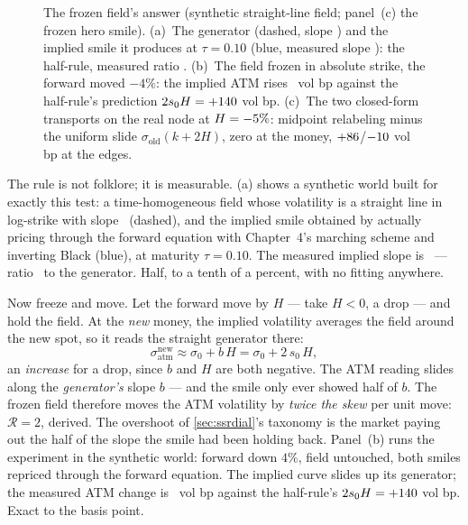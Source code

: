 \begin{figure}[htbp]
\centering
{}
\caption{The frozen field's answer (synthetic straight-line field;
panel~(c) the frozen hero smile).  (a)~The generator (dashed, slope
\MacSsrHalfSlopeLoc) and the implied smile it produces at
$\tau=0.10$ (blue, measured slope \MacSsrHalfSlopeImp): the half-rule,
measured ratio \MacSsrHalfRatio.  (b)~The field frozen in absolute
strike, the forward moved $-4\%$: the implied ATM rises
\MacSsrHalfAtmMoveBp\ vol bp against the half-rule's prediction
$2s_0H=+140$ vol bp.  (c)~The two closed-form
transports on the real node at $H=-5\%$: midpoint
relabeling minus the uniform slide $\sigma_{\mathrm{old}}(k+2H)$, zero
at the money,
$+86$/$-10$ vol bp at the edges.}
\label{fig:ssrhalf}
\end{figure}

The rule is not folklore; it is measurable.  (a)
shows a synthetic world built for exactly this test: a
time-homogeneous field whose volatility is a straight line in
log-strike with slope \MacSsrHalfSlopeLoc\ (dashed), and the implied
smile obtained by actually pricing through the forward equation with
Chapter~4's marching scheme and inverting Black (blue), at maturity
$\tau=0.10$.  The measured implied slope is \MacSsrHalfSlopeImp\ ---
ratio \MacSsrHalfRatio\ to the generator.  Half, to a tenth of a
percent, with no fitting anywhere.

Now freeze and move.  Let the forward move by $H$ --- take $H<0$, a
drop --- and hold the field.  At the \emph{new} money, the implied
volatility averages the field around the new spot, so it reads the
straight generator there:
\[
\sigma_{\mathrm{atm}}^{\mathrm{new}}
\approx\sigma_{0}+b\,H
=\sigma_{0}+2\,s_0\,H ,
\]
an \emph{increase} for a drop, since $b$ and $H$ are both negative.
The ATM reading slides along the \emph{generator's} slope $b$ --- and
the smile only ever showed half of $b$.  The frozen field therefore
moves the ATM volatility by \emph{twice the skew} per unit move:
$\mathcal{R}=2$, derived.  The overshoot of
\cref{sec:ssrdial}'s taxonomy is the market paying out the half of the
slope the smile had been holding back.  Panel~(b) runs the experiment
in the synthetic world: forward down $4\%$, field untouched, both
smiles repriced through the forward equation.  The implied curve
slides up its generator; the measured ATM change is
\MacSsrHalfAtmMoveBp\ vol bp against the half-rule's
$2s_0H=+140$ vol bp.  Exact to the basis point.

